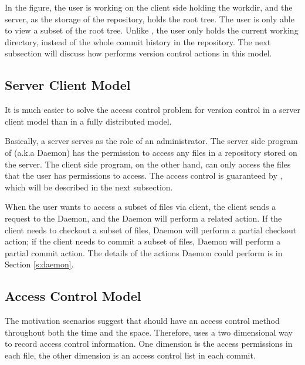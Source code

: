 In the figure, the user is working on the client side holding the workdir, and
the server, as the storage of the repository, holds the root tree. The user is
only able to view a subset of the root tree. Unlike \git, the user only holds the
current working directory, instead of the whole commit history in the
repository. The next subsection will discuss how \sys performs version control
actions in this model.

\subsection{Server Client Model}

It is much easier to solve the access control problem for version control in a
server client model than in a fully distributed model. 

Basically, a server serves as the role of an administrator. The server side
program of \sys (a.k.a \Sys Daemon) has the permission to access any files in a
repository stored on the server. The client side program, on the other hand, can
only access the files that the user has permissions to access.  The access control is
guaranteed by \sys, which will be described in the next subsection.

When the user wants to access a subset of files via \sys client, the client
sends a request to the \Sys Daemon, and the \Sys Daemon will perform a related
action. If the client needs to checkout a subset of files, \Sys Daemon will
perform a partial checkout action; if the client needs to commit a subset of
files, \Sys Daemon will perform a partial commit action. The details of the
actions \Sys Daemon could perform is in Section \ref{s:daemon}.

\subsection{Access Control Model}
\label{ss:access-model}

The motivation scenarios suggest that \sys should have an access control method
throughout both the time and the space. 
Therefore, \sys uses a two dimensional  way to record
access control information. One dimension is the access permissions in each
file, the other dimension is an access control list in each commit.

